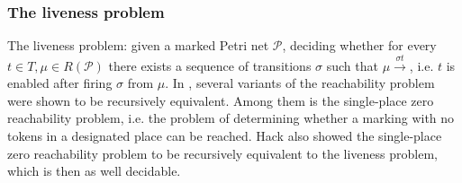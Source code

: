 \subsubsection{The liveness problem} %
\label{ssub:the_liveness_problem}
  The liveness problem: given a marked Petri net $\mathcal P$, deciding whether for every $t\in T, \mu\in R(\mathcal P)$ there exists a sequence of transitions $\sigma$ such that $\mu\xrightarrow{\sigma t}$, i.e. $t$ is enabled after firing $\sigma$ from $\mu$. In \cite{Hack74PetriNetLiveness}, several variants of the reachability problem were shown to be recursively equivalent. Among them is the single-place zero reachability problem, i.e. the problem of determining whether a marking with no tokens in a designated place can be reached. Hack also showed the single-place zero reachability problem to be recursively equivalent to the liveness problem, which is then as well decidable.


